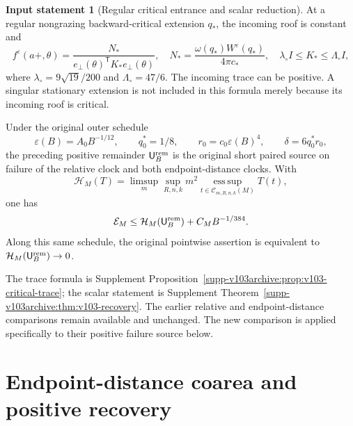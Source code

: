 \documentclass[11pt,reqno]{amsart}
\numberwithin{equation}{section}
\theoremstyle{definition}\newtheorem{definition}[theorem]{Definition}
\theoremstyle{remark}\newtheorem{remark}[theorem]{Remark}
\theoremstyle{definition}\newtheorem{inputstatement}[theorem]{Input statement}
\newcommand{\esssup}{\operatorname*{ess\,sup}}
\begin{document}
\begin{inputstatement}[Regular critical entrance and scalar reduction]
\label{input:v104-scalar}
At a regular nongrazing backward-critical extension $q_*$, the
incoming roof is constant and
\begin{equation}\label{eq:v104-critical-input}
 f^\varepsilon(a+,\theta)
 =\frac{N_*}{e_\perp(\theta)^{\mathsf T}K_*e_\perp(\theta)},
 \quad N_*=\frac{\omega(q_*)W^\varepsilon(q_*)}{4\pi c_*},
 \quad \lambda_\circ I\le K_*\le\Lambda_\circ I,
\end{equation}
where $\lambda_\circ=9\sqrt{19}/200$ and $\Lambda_\circ=47/6$.
The incoming trace can be positive. A singular stationary extension
is not included in this formula merely because its incoming roof
is critical.

Under the original outer schedule
\begin{equation}\label{eq:v104-schedule}
 \varepsilon(B)=A_0B^{-1/12},\qquad q_0^*=1/8,\qquad
 r_0=c_0\varepsilon(B)^4,\qquad\delta=6q_0^*r_0,
\end{equation}
the preceding positive remainder $\mathsf U_B^{\rm rem}$ is the
original short paired source on failure of the relative clock and
both endpoint-distance clocks. With
\[
 \mathcal H_M(T)=\limsup_m\sup_{R,n,k}m^2
       \esssup_{t\in\mathcal C_{m,R,n,k}(M)}T(t),
\]
one has
\begin{equation}\label{eq:v104-old-remainder}
 \mathcal E_M\le\mathcal H_M(\mathsf U_B^{\rm rem})
                                       +C_MB^{-1/384}.
\end{equation}
Along this same schedule, the original pointwise assertion is
equivalent to $\mathcal H_M(\mathsf U_B^{\rm rem})\to0$.
\end{inputstatement}
The trace formula is Supplement
Proposition~\ref{supp-v103archive:prop:v103-critical-trace}; the
scalar statement is Supplement Theorem~\ref{supp-v103archive:thm:v103-recovery}.
The earlier relative and endpoint-distance comparisons remain
available and unchanged. The new comparison is applied specifically
to their positive failure source below.





\appendix


\endgroup
\part{Endpoint-distance coarea and positive recovery}
\begingroup
\let\ArchiveLabel\label
\let\ArchiveRef\ref
\renewcommand{\label}[1]{\ArchiveLabel{v103archive:#1}}
\renewcommand{\ref}[1]{%
  \IfBeginWith{#1}{supp-}{%
    \StrBehind{#1}{supp-}[\ArchiveTarget]%
    \ArchiveRef{\ArchiveTarget}%
  }{\ArchiveRef{v103archive:#1}}%
}
\makeatletter
\let\ltx@label\label
\makeatother
\end{document}
